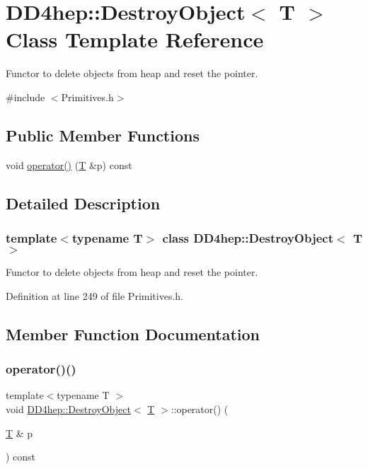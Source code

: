 \hypertarget{class_d_d4hep_1_1_destroy_object}{}\section{D\+D4hep\+:\+:Destroy\+Object$<$ T $>$ Class Template Reference}
\label{class_d_d4hep_1_1_destroy_object}


Functor to delete objects from heap and reset the pointer.  




{\ttfamily \#include $<$Primitives.\+h$>$}

\subsection*{Public Member Functions}
\begin{DoxyCompactItemize}
\item 
void \hyperlink{class_d_d4hep_1_1_destroy_object_a2912dd908993138e6fc2fc8bb797eccd}{operator()} (\hyperlink{class_t}{T} \&p) const
\end{DoxyCompactItemize}


\subsection{Detailed Description}
\subsubsection*{template$<$typename T$>$\newline
class D\+D4hep\+::\+Destroy\+Object$<$ T $>$}

Functor to delete objects from heap and reset the pointer. 

Definition at line 249 of file Primitives.\+h.



\subsection{Member Function Documentation}
\hypertarget{class_d_d4hep_1_1_destroy_object_a2912dd908993138e6fc2fc8bb797eccd}{}\label{class_d_d4hep_1_1_destroy_object_a2912dd908993138e6fc2fc8bb797eccd} 
\subsubsection{\texorpdfstring{operator()()}{operator()()}}
{\footnotesize\ttfamily template$<$typename T $>$ \\
void \hyperlink{class_d_d4hep_1_1_destroy_object}{D\+D4hep\+::\+Destroy\+Object}$<$ \hyperlink{class_t}{T} $>$\+::operator() (\begin{DoxyParamCaption}\item[{\hyperlink{class_t}{T} \&}]{p }\end{DoxyParamCaption}) const\hspace{0.3cm}{\ttfamily [inline]}}



